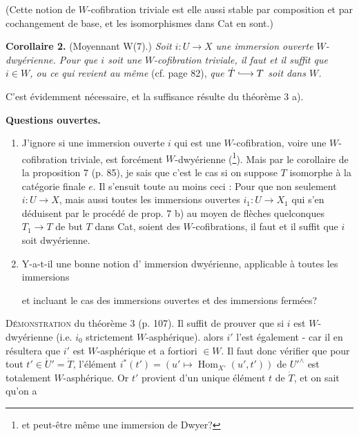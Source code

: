 \documentclass[11pt]{article}
\newcommand{\printedpage}[1]{\marginpar{\footnotesize p.~#1}}
\newcommand{\msp}[1]{\marginpar{\footnotesize [#1]}}
\newcommand{\hra}{\lhook\joinrel\longrightarrow}
\begin{document}
(Cette notion de $W$-cofibration triviale est elle aussi stable par composition et par cochangement de base, et les isomorphismes dans Cat en sont.)

\msp{page 111}

\textbf{Corollaire 2.} (Moyennant W(7).) \textit{Soit $i:U\longrightarrow X$ une immersion ouverte $W$-dwyérienne. Pour que $i$ soit une $W$-cofibration triviale, il faut et il suffit que $i\in W$, ou ce qui revient au même} (cf. page 82), \textit{que $\dot{T}\hra T$ soit dans $W$.}

C'est évidemment nécessaire, et la suffisance résulte du théorème 3 a).

\textbf{Questions ouvertes.}

\begin{enumerate}[label=\alph*)]
\item J'ignore si une immersion ouverte $i$ qui est une $W$-cofibration, voire une $W$-cofibration triviale, est forcément $W$-dwyérienne (\footnote{et peut-être même une immersion de Dwyer?}). Mais par le corollaire de la proposition 7 (p. 85), je sais que c'est le cas si on suppose $T$ isomorphe à la catégorie finale $e$. Il s'ensuit toute au moins ceci : Pour que non seulement $i:U\longrightarrow X$, mais aussi toutes les immersions ouvertes $i_1:U\longrightarrow X_1$ qui s'en déduisent par le procédé de prop. 7 b) au moyen de flèches quelconques $T_1\longrightarrow T$ de but $T$ dans Cat, soient des $W$-cofibrations, il faut et il suffit que $i$ soit dwyérienne. %

\item \printedpage{77}
Y-a-t-il une bonne notion d' immersion dwyérienne, applicable à toutes les immersions

\msp{page 112}

et incluant le cas des immersions ouvertes et des immersions fermées?
\end{enumerate}

\textsc{Démonstration} du théorème 3 (p. 107). Il suffit de prouver que si $i$ est $W$-dwyérienne (i.e. $i_0$ strictement $W$-asphérique). alors $i'$ l'est également - car il en résultera que $i'$ est $W$-asphérique et a fortiori $\in W$. Il faut donc vérifier que pour tout $t'\in\dot{U}'=\dot{T}$, l'élément $i^*(t')=(u'\longmapsto\operatorname{Hom}_{X'}(u',t'))$ de $U'^\wedge$ est totalement $W$-asphérique. Or $t'$ provient d'un unique élément $t$ de $\dot{T}$, et on sait qu'on a %
\end{document}
